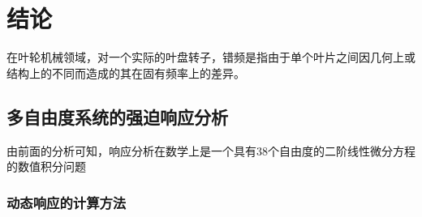 \chapter{结论}
在叶轮机械领域，对一个实际的叶盘转子，错频是指由于单个叶片之间因几何上或结构上的不同而造成的其在固有频率上的差异。
\section{多自由度系统的强迫响应分析}
由前面的分析可知，响应分析在数学上是一个具有38个自由度的二阶线性微分方程的数值积分问题
\subsection{动态响应的计算方法}
